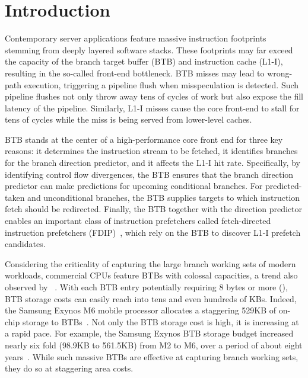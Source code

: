\section{Introduction}
\label{hpca:sec:intro}

Contemporary server applications feature massive instruction footprints stemming from deeply layered software stacks. These footprints may far exceed the capacity of the branch target buffer (BTB) and instruction cache (L1-I), resulting in the so-called front-end bottleneck. BTB misses may lead to wrong-path execution, triggering a pipeline flush when misspeculation is detected. Such pipeline flushes not only throw away tens of cycles of work but also expose the fill latency of the pipeline. Similarly, L1-I misses cause the core front-end to stall for tens of cycles while the miss is being served from lower-level caches. 

BTB stands at the center of a high-performance core front end for three key reasons: it determines the instruction stream to be fetched, it identifies branches for the branch direction predictor, and it affects the L1-I hit rate. Specifically, by identifying control flow divergences, the BTB ensures that the branch direction predictor can make predictions for upcoming conditional branches. For predicted-taken and unconditional branches, the BTB supplies targets to which instruction fetch should be redirected. Finally, the BTB together with the direction predictor enables an important class of instruction prefetchers called fetch-directed instruction prefetchers (FDIP)~\cite{fdip, boomerang, shotgun, shotgunTOCS}, which rely on the BTB to discover L1-I prefetch candidates. 

Considering the criticality of capturing the large branch working sets of modern workloads, commercial CPUs feature BTBs with colossal capacities, a trend also observed by ~\cite{rebase}. With each BTB entry potentially requiring 8 bytes or more (), BTB storage costs can easily reach into tens and even hundreds of KBs. Indeed, the Samsung Exynos M6 mobile processor allocates a staggering 529KB of on-chip storage to BTBs~\cite{exynos}. Not only the BTB storage cost is high, it is increasing at a rapid pace. For example, the Samsung Exynos BTB storage budget increased nearly six fold (98.9KB to 561.5KB) from M2 to M6, over a period of about eight years~\cite{exynos}. While such massive BTBs are effective at capturing branch working sets, they do so at staggering area costs.

